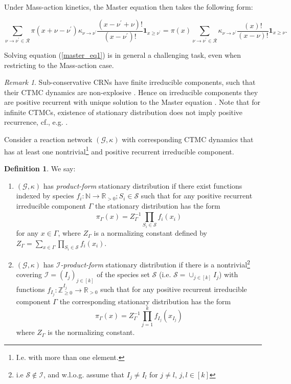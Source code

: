 \documentclass{amsart}
\theoremstyle{definition}
\newtheorem{definition}[theorem]{Definition}
\theoremstyle{remark}
\newtheorem{remark}[theorem]{Remark}
\theoremstyle{Conjecture/open problem}
\theoremstyle{assumption}
\theoremstyle{conjecture}
\def\I{\mathcal{I}}
\def\Ga{\Gamma}
\def\1{\mathbf{1}}
\def\p{^{\prime}}
\def\k{\kappa}
\def\cG{\mathcal{G}}
\def\cR{\mathcal{R}}
\def\cS{\mathcal{S}}
\def\R{\mathbb{R}}
\def\N{\mathbb{N}}
\def\Z{\mathbb{Z}}
\numberwithin{equation}{section}
\begin{document}
Under Mass-action kinetics, the Master equation then takes the following form:

\begin{equation} \label{master_eq2}  \sum_{\nu\to\nu\p\in\cR} \pi(x+\nu-\nu\p)\k_{\nu\to\nu\p}\frac{(x-\nu\p+\nu)!}{(x-\nu\p)!}\1_{x\geq \nu\p}=\pi(x)\sum_{\nu\to\nu\p\in\cR}\k_{\nu\to\nu\p}\frac{(x)!}{(x-\nu)!}\1_{x\geq \nu}.\end{equation}





Solving equation (\ref{master_eq1}) is in general a challenging task, even when restricting to the Mass-action case. 
\begin{remark}\label{rmk_pos_cons}
Sub-conservative CRNs have finite irreducible components, such that their CTMC dynamics are non-explosive \cite[Theorem 2.7.1]{norris}. Hence on irreducible components they are positive recurrent with unique solution to the Master equation \cite[Theorem 3.5.3]{norris}. 
Note that for infinite CTMCs, existence of stationary distribution does not imply positive recurrence, cf., e.g. \cite[Ex 3.5.4]{norris}. 
\end{remark}






Consider a reaction network $(\cG,\k)$ with corresponding CTMC dynamics that has at least one nontrivial\footnote{I.e. with more than one element.} and positive recurrent irreducible component. \begin{definition}\label{prod_f}
We say:\begin{enumerate}
    \item $(\cG,\k)$ has \emph{product-form} stationary distribution if there exist functions indexed by species $f_i: \N\to \R_{>0}; S_i\in \cS$ such that for any positive recurrent irreducible component $\Ga$ the stationary distribution has the form
$$\pi_\Ga(x)=Z^{-1}_\Ga\prod_{S_i\in\cS}^{ } f_i(x_i)$$
 for any $x\in\Ga$, where $Z_\Ga$ is a normalizing constant defined by\\
$Z_\Ga=\sum_{x\in\Ga}\prod_{S_i\in\cS}^{ } f_i(x_i)$.
\item $(\cG,\k)$ has \emph{$\I$-product-form} stationary distribution if there is a nontrivial\footnote{i.e $\cS\not\in\I$, and w.l.o.g. assume that $I_j\neq I_l$ for  $j\neq l$, $j,l\in [k]$} covering $\I=(I_j)_{j\in [k]}$ of the species set $\cS$ (i.e. $\cS=\cup_{j\in [k]}I_j$) with functions $f_{I_j}:\Z_{\geq0}^{I_j}\to \R_{>0}$ such that for any positive recurrent irreducible component $\Ga$ the corresponding stationary distribution has the form
$$\pi_\Ga(x)=Z^{-1}_\Ga\prod_{j=1}^{k} f_{I_j}(x_{I_j})$$
where $Z_\Ga$ is the normalizing constant.
\end{enumerate}
\end{definition}
\end{document}
